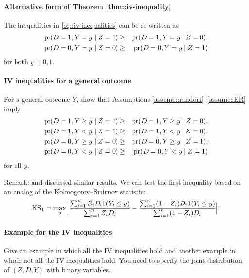  





\paragraph{Alternative form of Theorem \ref{thm::iv-inequality}}
\label{hw::ivineq-binary}

The inequalities in \eqref{eq::iv-inequalities} can be re-written as
\begin{eqnarray*}
\textup{pr}(D=1, Y=y\mid Z=1) &\geq & \textup{pr}(D=1, Y=y\mid Z=0), \\
\textup{pr}(D=0, Y=y\mid Z=0) &\geq & \textup{pr}(D=0, Y=y\mid Z=1)
\end{eqnarray*}
for both $y=0,1$. 



\paragraph{IV inequalities for a general outcome}
\label{hw::ivineq-general-Y}

For a general outcome $Y$, show that Assumptions \ref{assume::random}--\ref{assume::ER} imply 
\begin{eqnarray*}
\textup{pr}(D=1, Y\geq y\mid Z=1) &\geq & \textup{pr}(D=1, Y\geq y\mid Z=0), \\
\textup{pr}(D=1, Y <  y\mid Z=1) &\geq & \textup{pr}(D=1, Y <  y\mid Z=0), \\
\textup{pr}(D=0, Y\geq y\mid Z=0) &\geq & \textup{pr}(D=0, Y\geq y\mid Z=1),\\
\textup{pr}(D=0, Y <  y\mid Z=0) &\geq & \textup{pr}(D=0, Y <  y\mid Z=1)
\end{eqnarray*}
for all $y$. 
 
Remark:  \citet{imbens1997estimating} and \citet{kitagawa2015test} discussed similar results.  We can test the first inequality based on an analog of the Kolmogorov--Smirnov statistic:
$$
\text{KS}_1 = \max_{y} \Big |
\frac{  \sum_{i=1}^n Z_i D_i  1(Y_i \leq y)  }{ \sum_{i=1}^n Z_i D_i  } - \frac{  \sum_{i=1}^n (1-Z_i) D_i  1(Y_i \leq y)  }{ \sum_{i=1}^n (1-Z_i) D_i  }
\Big |.
$$



\paragraph{Example for the IV inequalities}

Give an example in which all the IV inequalities hold and another example in which not all the IV inequalities hold. You need to specify the joint distribution of $(Z,D,Y)$ with binary variables. 


